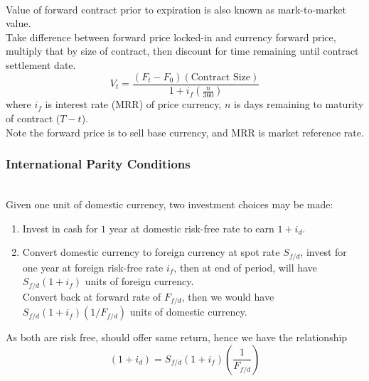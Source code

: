 \begin{remark} \\
Value of forward contract prior to expiration is also known as mark-to-market value.\\
Take difference between forward price locked-in and currency forward price, multiply that by size of contract, then discount for time remaining until contract settlement date.
\begin{equation}
V_t = \frac{(F_t - F_0)(\text{Contract Size})}{1 + i_f(\frac{n}{360})} \nonumber
\end{equation}
where $i_f$ is interest rate (MRR) of price currency, $n$ is days remaining to maturity of contract ($T-t$).\\
Note the forward price is to sell base currency, and MRR is market reference rate.
\end{remark}

\subsubsection{International Parity Conditions}

\begin{remark} \\
Given one unit of domestic currency, two investment choices may be made:
\begin{enumerate}[label=\roman*.]
\setlength{\itemsep}{0pt}
\item Invest in cash for $1$ year at domestic risk-free rate to earn $1 + i_d$.
\item Convert domestic currency to foreign currency at spot rate $S_{f/d}$, invest for one year at foreign risk-free rate $i_f$, then at end of period, will have $S_{f/d}(1+i_f)$ units of foreign currency.\\
Convert back at forward rate of $F_{f/d}$, then we would have $S_{f/d}(1+i_f)(1/F_{f/d})$ units of domestic currency.
\end{enumerate}
As both are risk free, should offer same return, hence we have the relationship
\begin{equation}
(1+i_d) = S_{f/d} (1+i_f) \left( \frac{1}{F_{f/d}} \right) \nonumber
\end{equation}
\end{remark}

